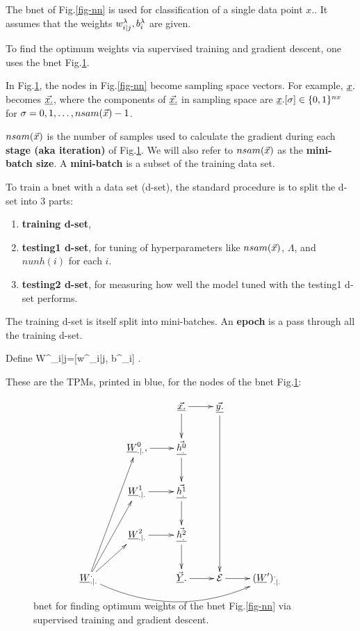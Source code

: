 The bnet of Fig.\ref{fig-nn}
is used for classification
of a single data point $x.$.
It assumes that the
weights $w^\lambda_{i|j}, b_i^\lambda$
are given.

To find the optimum
weights via supervised
training and gradient descent,
one uses the bnet Fig.\ref{fig-nn-ext}.

In Fig.\ref{fig-nn-ext},
the nodes in
Fig.\ref{fig-nn} become 
sampling space vectors.
For example, ${\underline{x}}.$ becomes
$\underline{\vec{x.}}$, where the
components of 
$\underline{\vec{x.}}$ in sampling space are
${\underline{x}}.[\sigma]\in \{0,1\}^{nx}$
for $\sigma=0, 1, \ldots, nsam({\vec{x}})-1$.


$nsam({\vec{x}})$
is the number of
samples used to calculate the
gradient
during each {\bf stage (aka iteration)} of
Fig.\ref{fig-nn-ext}.
We will also  refer to
$nsam({\vec{x}})$ as the {\bf mini-batch size}.
A {\bf mini-batch} is a subset 
of the training data set.



To train a bnet with a data
set (d-set),
the standard procedure
is to split the d-set into 3 parts:
\begin{enumerate}
\item
{\bf training d-set}, 
\item
{\bf testing1 d-set}, for
tuning
of hyperparameters 
like $nsam({\vec{x}})$,  $\Lambda$,
and $nunh(i)$
for each $i$. 
\item
{\bf testing2 d-set}, for measuring
how well the model
tuned with the testing1 d-set
performs.
\end{enumerate}

The training d-set is 
itself split into mini-batches.
An {\bf epoch} is a pass through all 
the training d-set.

Define
\beq
W^\lam_{i|j}=[w^\lam_{i|j}, b^\lam_i]
\;.
\eeq

These are the
TPMs,
printed in blue, for 
the nodes of the bnet 
Fig.\ref{fig-nn-ext}:

\begin{figure}[h!]
\centering
$$\xymatrix{
&&\ranvec{x.}\ar[d]\ar[r]&
\ranvec{y.}\ar[dddd]\\
&\rvW^0_{.|.}, \ar[r]&
\ranvec{h^0_.}\ar[d]\\
&\rvW^1_{.|.}\ar[r]&
\ranvec{h^1_.}\ar[d]\\
&\rvW^2_{.|.}\ar[r]&
\ranvec{h^2_.}\ar[d]\\
\rvW^._{.|.}\ar[ru]\ar[ruu]\ar[ruuu]
\ar@/_2pc/[rrrr]
&&
\vec{\rvY}.\ar[r]&\cale\ar[r]&
(\rvW')^._{.|.}
}$$
\caption{bnet 
for 
finding optimum
weights of the bnet 
Fig.\ref{fig-nn} via
supervised training
and gradient descent.
}
\label{fig-nn-ext}
\end{figure}

